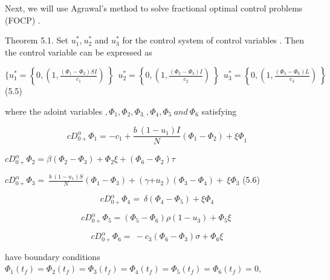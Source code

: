 \documentclass[10pt]{NSP1}
\numberwithin{equation}{section}
\begin{document}
Next, we will use Agrawal’s method to solve fractional optimal control problems (FOCP) \cite{ref38}.

Theorem 5.1. Set $u_{1}^{\ast}$,$\ u_{2}^{\ast}$ and $u_{3}^{\ast}$ for the control system of control variables . Then the control variable can be expressed as

$\{ u_{1}^{\ast} = \left\{ 0,\left( 1,\frac{\left( \Phi_{1} - \Phi_{2} \right)SI}{c_{1}} \right)\  \right\}\ \ u_{2}^{\ast} = \left\{ 0,\left( 1,\frac{\left( \Phi_{2} - \Phi_{3} \right)I}{c_{2}} \right)\  \right\}\ \ u_{3}^{\ast} = \left\{ 0,\left( 1,\frac{\left( \Phi_{3} - \Phi_{6} \right)L}{c_{3}} \right)\  \right\}\ \ $ (5.5)

where the adoint variables $,\Phi_{1},\Phi_{2},\Phi_{3,},\Phi_{4},\Phi_{5}\ and\ \Phi_{6}$ satisfying

\begin{equation}
{cD}_{0 +}^{\alpha}\Phi_{1} = {- c}_{1} + \frac{b\ \left( 1 - u_{1} \right)I}{N}\left( \Phi_{1} - \Phi_{2} \right) + {\xi\Phi}_{1}

\end{equation}

${cD}_{0 +}^{\alpha}\Phi_{2} = \beta\left( \Phi_{2} - \Phi_{3} \right) + \Phi_{2}\xi + (\Phi_{6} - \Phi_{2})\tau$

${cD}_{0 +}^{\alpha}\Phi_{3} = \ \frac{b\ \left( 1 - u_{1} \right)S}{N}\left( \Phi_{1} - \Phi_{3} \right) + (\gamma{+ u}_{2})\left( \Phi_{3} - \Phi_{4} \right) + \ \xi\Phi_{3}$ (5.6)

\begin{equation}
{cD}_{0 +}^{\alpha}\Phi_{4} = \ \delta\left( \Phi_{4} - \Phi_{5} \right) + \xi\Phi_{4}

\end{equation}

\begin{equation}
{cD}_{0 +}^{\alpha}\Phi_{5} = \left( \Phi_{5} - \Phi_{6} \right)\rho\left( 1 - u_{3} \right) + \Phi_{5}\xi\ 

\end{equation}

\begin{equation}
{cD}_{0 +}^{\alpha}\Phi_{6} = \  - c_{3}\left( \Phi_{6} - \Phi_{3} \right)\sigma + \Phi_{6}\xi

\end{equation}

have boundary conditions $\Phi_{1}\left( t_{f} \right) = \Phi_{2}\left( t_{f} \right) = \Phi_{3}\left( t_{f} \right) = \Phi_{4}\left( t_{f} \right) = \Phi_{5}\left( t_{f} \right) = \Phi_{6}\left( t_{f} \right) = 0,$
\end{document}
